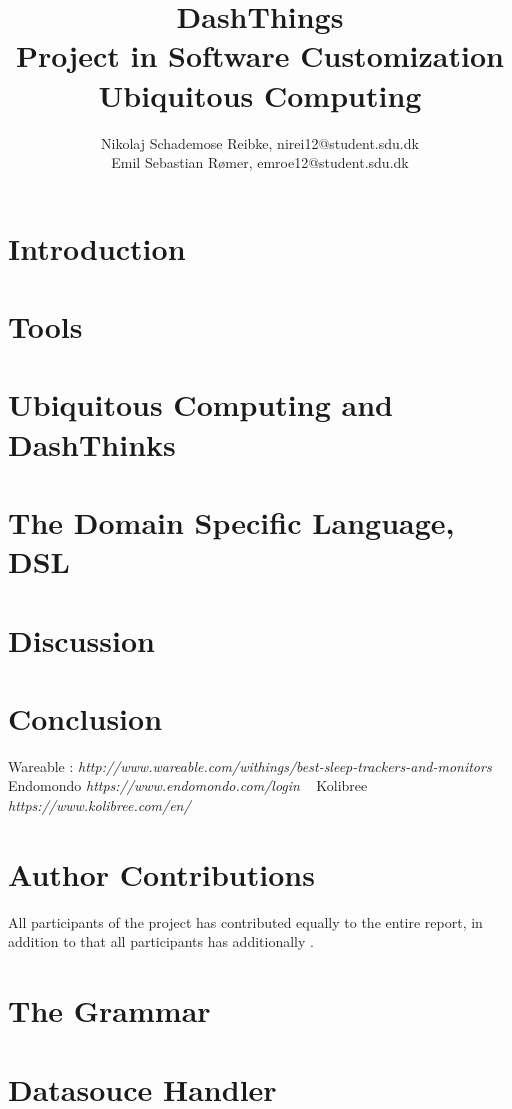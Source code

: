 \documentclass[10pt,a4paper,twocolumn]{article}
\begin{document}
\title{\textbf{DashThings \\ Project in Software Customization Ubiquitous Computing}}

\author{Nikolaj Schademose Reibke, nirei12@student.sdu.dk\\Emil Sebastian R{\o}mer, emroe12@student.sdu.dk}

\maketitle

\section{Introduction}


\section{Tools}


\section{Ubiquitous Computing and DashThinks}


\section{The Domain Specific Language, DSL}


\section{Discussion}


\section{Conclusion}


\begin{thebibliography}{1}
 Wareable : \textit{http://www.wareable.com/withings/best-sleep-trackers-and-monitors} 
 Endomondo \textit{https://www.endomondo.com/login}
\
 Kolibree \textit{https://www.kolibree.com/en/}
\end{thebibliography}

\appendix
\section{Author Contributions}
All participants of the project has contributed equally to the entire report,
in addition to that all participants has additionally .

\section{The Grammar}


\section{Datasouce Handler}

\end{document}
